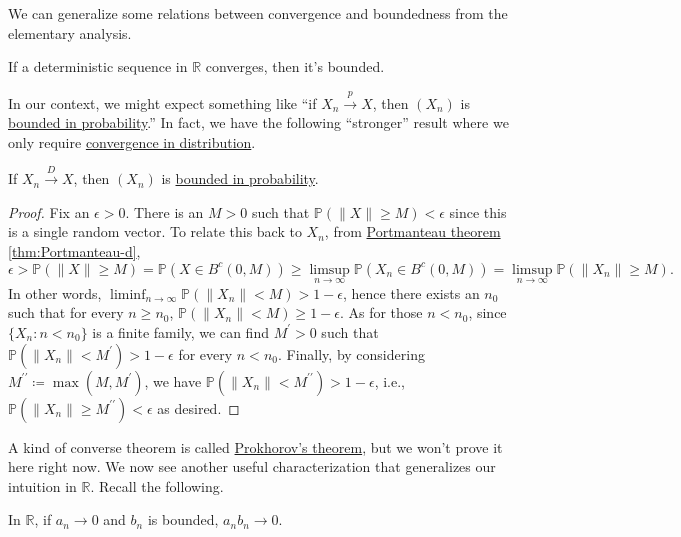 We can generalize some relations between convergence and boundedness from the elementary analysis.

\begin{prev}
	If a deterministic sequence in \(\mathbb{R} \) converges, then it's bounded.
\end{prev}

In our context, we might expect something like ``if \(X_n \overset{p}{\to } X \), then \((X_n)\) is \hyperref[def:bounded-in-probability]{bounded in probability}.'' In fact, we have the following ``stronger'' result where we only require \hyperref[def:converge-in-distribution]{convergence in distribution}.

\begin{proposition}\label{prop:convergence-in-distirbution-bounded-in-probability}
	If \(X_n \overset{D}{\to } X\), then \((X_n)\) is \hyperref[def:bounded-in-probability]{bounded in probability}.
\end{proposition}
\begin{proof}
	Fix an \(\epsilon > 0\). There is an \(M > 0\) such that \(\mathbb{P} (\lVert X \rVert \geq M) < \epsilon \) since this is a single random vector. To relate this back to \(X_n\), from \hyperref[thm:Portmanteau]{Portmanteau theorem} \autoref{thm:Portmanteau-d},
	\[
		\epsilon
		> \mathbb{P} (\lVert X \rVert \geq M)
		= \mathbb{P} (X \in B^{c} (0, M))
		\geq \limsup_{n \to \infty} \mathbb{P} (X_n \in B^{c} (0, M))
		= \limsup_{n \to \infty} \mathbb{P} (\lVert X_n \rVert \geq M).
	\]
	In other words, \(\liminf_{n \to \infty} \mathbb{P} (\lVert X_n \rVert < M) > 1 - \epsilon\), hence there exists an \(n_0\) such that for every \(n \geq n_0\), \(\mathbb{P} (\lVert X_n \rVert < M) \geq 1 - \epsilon \). As for those \(n < n_0\), since \(\{ X_n \colon n < n_0 \} \) is a finite family, we can find \(M^{\prime} > 0\) such that \(\mathbb{P} (\lVert X_n \rVert < M^{\prime} ) > 1 - \epsilon \) for every \(n < n_0\). Finally, by considering \(M^{\prime\prime} \coloneqq \max (M, M^{\prime} )\), we have \(\mathbb{P} (\lVert X_n \rVert < M^{\prime\prime} ) > 1 - \epsilon \), i.e., \(\mathbb{P} (\lVert X_n \rVert \geq M^{\prime\prime} ) < \epsilon \) as desired.
\end{proof}

A kind of converse theorem is called \hyperref[thm:Prokhorov]{Prokhorov's theorem}, but we won't prove it here right now. We now see another useful characterization that generalizes our intuition in \(\mathbb{R} \). Recall the following.

\begin{prev}
	In \(\mathbb{R} \), if \(a_n \to 0\) and \(b_n\) is bounded, \(a_n b_n \to 0\).
\end{prev}


